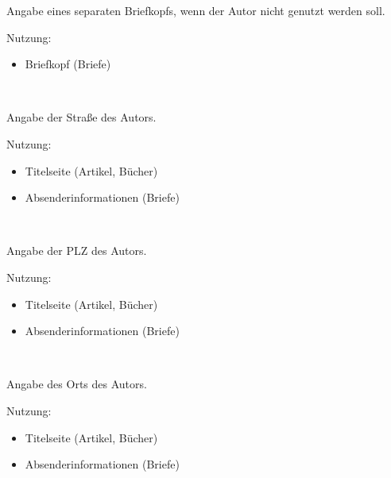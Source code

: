 \DescribeMacro{\briefkopf}
Angabe eines separaten Briefkopfs, wenn der Autor nicht genutzt werden soll.

Nutzung:
\begin{itemize}
	\item Briefkopf (Briefe)
\end{itemize}

\begin{nutzung}
		\>\\
	\beispiel
		\>
\end{nutzung}

\DescribeMacro{\strasse}
Angabe der Straße des Autors.

Nutzung:
\begin{itemize}
	\item Titelseite (Artikel, Bücher)
	\item Absenderinformationen (Briefe)
\end{itemize}

\begin{nutzung}
		\>\\
	\beispiel
		\>
\end{nutzung}

\DescribeMacro{\plz}
Angabe der PLZ des Autors.

Nutzung:
\begin{itemize}
	\item Titelseite (Artikel, Bücher)
	\item Absenderinformationen (Briefe)
\end{itemize}

\begin{nutzung}
		\>\\
	\beispiel
		\>
\end{nutzung}

\DescribeMacro{\ort}
Angabe des Orts des Autors.

Nutzung:
\begin{itemize}
	\item Titelseite (Artikel, Bücher)
	\item Absenderinformationen (Briefe)
\end{itemize}

\begin{nutzung}
		\>\\
	\beispiel
		\>
\end{nutzung}

